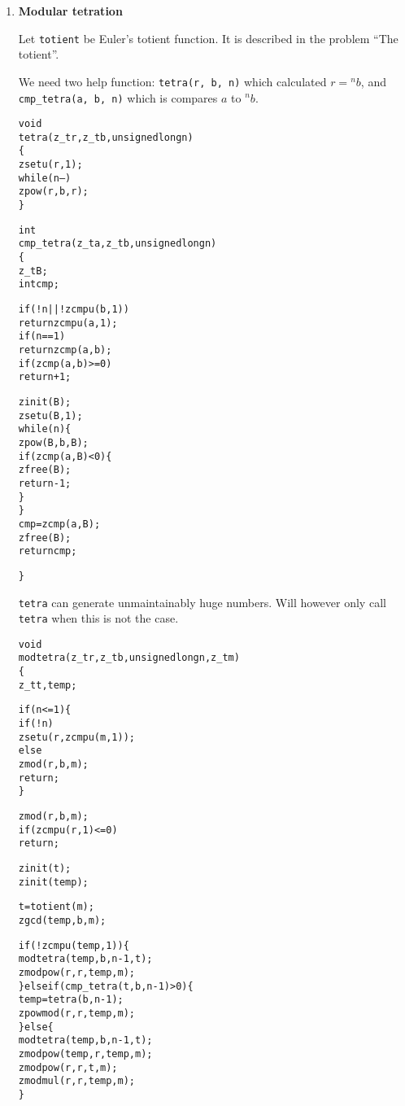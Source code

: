 \begin{enumerate}[label=\textbf{\arabic*}.]
\item \textbf{Modular tetration}

Let \texttt{totient} be Euler's totient function.
It is described in the problem ``The totient''.

We need two help function: \texttt{tetra(r, b, n)}
which calculated $r = {}^n{}b$, and \texttt{cmp\_tetra(a, b, n)}
which is compares $a$ to ${}^n{}b$.

\vspace{-1em}
\begin{alltt}
void
tetra(z_t r, z_t b, unsigned long n)
\{
    zsetu(r, 1);
    while (n--)
        zpow(r, b, r);
\}
\end{alltt}
\vspace{-1em}

\vspace{-1em}
\begin{alltt}
int
cmp_tetra(z_t a, z_t b, unsigned long n)
\{
    z_t B;
    int cmp;

    if (!n || !zcmpu(b, 1))
        return zcmpu(a, 1);
    if (n == 1)
        return zcmp(a, b);
    if (zcmp(a, b) >= 0)
        return +1;

    zinit(B);
    zsetu(B, 1);
    while (n) \{
        zpow(B, b, B);
        if (zcmp(a, B) < 0) \{
            zfree(B);
            return -1;
        \}
    \}
    cmp = zcmp(a, B);
    zfree(B);
    return cmp;

\}
\end{alltt}
\vspace{-1em}

\texttt{tetra} can generate unmaintainably huge
numbers. Will however only call \texttt{tetra}
when this is not the case.

\vspace{-1em}
\begin{alltt}
void
modtetra(z_t r, z_t b, unsigned long n, z_t m)
\{
    z_t t, temp;

    if (n <= 1) \{
        if (!n)
            zsetu(r, zcmpu(m, 1));
        else
            zmod(r, b, m);
        return;
    \}

    zmod(r, b, m);
    if (zcmpu(r, 1) <= 0)
        return;

    zinit(t);
    zinit(temp);

    t = totient(m);
    zgcd(temp, b, m);

    if (!zcmpu(temp, 1)) \{
        modtetra(temp, b, n - 1, t);
        zmodpow(r, r, temp, m);
    \} else if (cmp_tetra(t, b, n - 1) > 0) \{
        temp = tetra(b, n - 1);
        zpowmod(r, r, temp, m);
    \} else \{
        modtetra(temp, b, n - 1, t);
        zmodpow(temp, r, temp, m);
        zmodpow(r, r, t, m);
        zmodmul(r, r, temp, m);
    \}


\end{alltt}
\end{enumerate}
